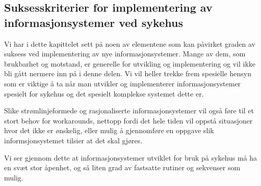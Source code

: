 \subsection{Suksesskriterier for implementering av informasjonsystemer ved sykehus}
\label{chp: suksess_sykehus}

Vi har i dette kapittelet sett på noen av elementene som kan påvirket graden av suksess ved implementering av nye informasjonsystemer. Mange av dem, som brukbarhet og motstand, er generelle for utvikling og implementering og vil ikke bli gått nermere inn på i denne delen. Vi vil heller trekke frem spesielle hensyn som er viktige å ta når man utvikler og implementerer informasjonsystemer spesielt for sykehus og det spesielt komplekse systemet dette er.

\noindent
Slike strømlinjeformede og rasjonaliserte informasjonsystemer vil også føre til et stort behov for workarounds, nettopp fordi det hele tiden vil oppstå situasjoner hvor det ikke er ønskelig, eller mulig å gjennomføre en oppgave slik informsjonsystemet tilsier at det skal gjøres. 

\noindent
Vi ser gjennom dette at informasjonsystemer utviklet for bruk på sykehus må ha en svæt stor åpenhet, og så liten grad av fastsatte rutiner og sekvenser som mulig.